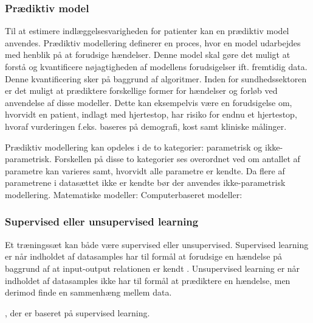\subsubsection{Prædiktiv model}
\noindent
Til at estimere indlæggelsesvarigheden for patienter kan en prædiktiv model anvendes.
Prædiktiv modellering definerer en proces, hvor en model udarbejdes med henblik på at forudsige hændelser. Denne model skal gøre det muligt at forstå og kvantificere nøjagtigheden af modellens forudsigelser ift. fremtidig data.\cite{Kuhn2013} Denne kvantificering sker på baggrund af algoritmer. 
Inden for sundhedssektoren er det muligt at prædiktere forskellige former for hændelser og forløb ved anvendelse af disse modeller. Dette kan eksempelvis være en forudsigelse om, hvorvidt en patient, indlagt med hjertestop, har risiko for endnu et hjertestop, hvoraf vurderingen f.eks. baseres på demografi, kost samt kliniske målinger\cite{Hastie2008}. %

Prædiktiv modellering kan opdeles i de to kategorier: parametrisk og ikke-parametrisk. Forskellen på disse to kategorier ses overordnet ved om antallet af parametre kan varieres samt, hvorvidt alle parametre er kendte. Da flere af parametrene i datasættet ikke er kendte bør der anvendes ikke-parametrisk modellering.\cite{Sheskin2000}
Matematiske modeller:
Computerbaseret modeller: 


\subsubsection{Supervised eller unsupervised learning}
Et træningssæt kan både være supervised eller unsupervised. Supervised learning er når indholdet af datasamples har til formål at forudsige en hændelse på baggrund af at input-output relationen er kendt \cite{Brownlee2013}. Unsupervised learning er når indholdet af datasamples ikke har til formål at prædiktere en hændelse, men derimod finde en sammenhæng mellem data.\cite{Brownlee2013, Kuhn2013} 



, der er baseret på supervised learning. 

